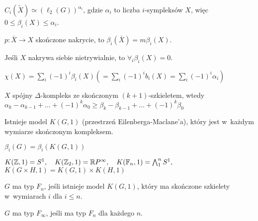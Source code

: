 

 


\begin{stwierdzenie}
	$C_i(\tilde{X}) \simeq (\ell_2(G))^{\alpha_i}$, 
	gdzie $\alpha_i$ to liczba $i$-sympleksów $X$,
	więc ${0 \leq \beta_i(X) \leq \alpha_i}$.
\end{stwierdzenie}

\begin{stwierdzenie}
	$p:\bar{X} \to X$ skończone nakrycie,
	to $\beta_i(\bar{X}) = m\beta_i(X)$.
\end{stwierdzenie}

\begin{wniosek}
	Jeśli $X$ nakrywa siebie nietrywialnie,
	to $\forall_i \beta_i(X) = 0$.
\end{wniosek}

\begin{twierdzenie}
	$\chi(X) = \sum_i (-1)^i \beta_i(X) 
	( = \sum_i(-1)^i b_i(X) = \sum_i (-1)^i \alpha_i)$
\end{twierdzenie}

\begin{wniosek}
	$X$ spójny $\Delta$-kompleks ze skończonym $(k+1)$-szkieletem,
	wtedy
	$\alpha_k - \alpha_{k-1} + \ldots + (-1)^k \alpha_0 \geq
	\beta_k - \beta_{k-1} + \ldots + (-1)^k \beta_0$
\end{wniosek}

\begin{twierdzenie}
	Istnieje model $K(G, 1)$ (przestrzeń Eilenberga-Maclane'a),
	który jest w~każdym wymiarze skończonym kompleksem.
\end{twierdzenie}

\begin{definicja}
	 $\beta_i(G) = \beta_i(K(G,1))$
\end{definicja}

\begin{przyklad}
	$K({\mathbb{Z}}, 1) = S^1, 
	\quad K({\mathbb{Z}}_2, 1)= {\mathbb{R}} P ^\infty, 
	\quad K({\mathbb{F}}_n, 1) = \bigwedge_1^n S^1,$ \\
	${K(G \times H, 1) = K(G, 1) \times K(H, 1)}$
\end{przyklad}

\begin{definicja}
	$G$ ma typ $F_n$, jeśli istnieje model $K(G, 1)$, który ma skończone szkielety w~wymiarach $i$ dla $i\leq n$.
	
	$G$ ma typ $F_\infty$, jeśli ma typ $F_n$ dla każdego $n$.
\end{definicja}

